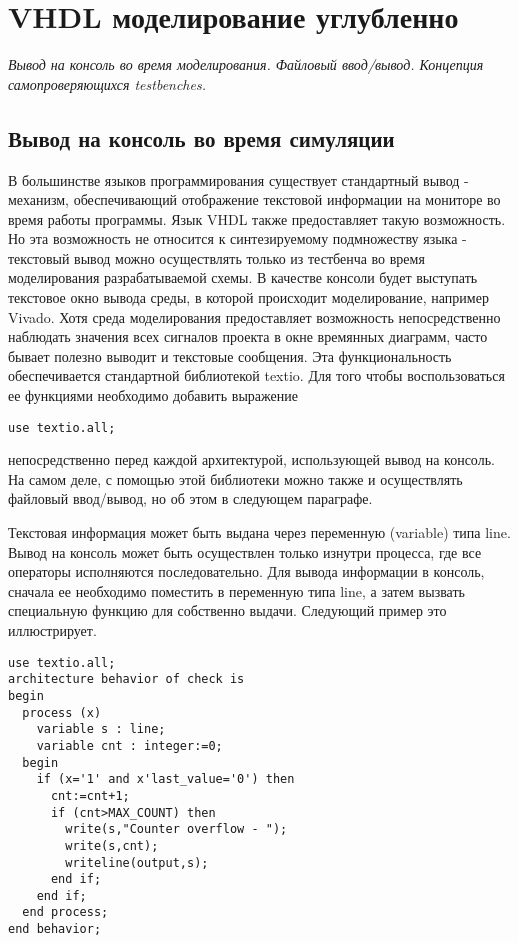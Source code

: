 \chapter{VHDL моделирование углубленно}

\emph{Вывод на консоль во время моделирования. Файловый ввод/вывод. Концепция самопроверяющихся testbenches.}

\section{Вывод на консоль во время симуляции}

В большинстве языков программирования существует стандартный вывод - механизм, обеспечивающий отображение текстовой информации на мониторе во время работы программы. Язык VHDL также предоставляет такую возможность. Но эта возможность не относится к синтезируемому подмножеству языка - текстовый вывод можно осуществлять только из тестбенча во время моделирования разрабатываемой схемы. В качестве консоли будет выступать текстовое окно вывода среды, в которой происходит моделирование, например Vivado. Хотя среда моделирования предоставляет возможность непосредственно наблюдать значения всех сигналов проекта в окне времянных диаграмм, часто бывает полезно выводит и текстовые сообщения. Эта функциональность обеспечивается стандартной библиотекой textio. Для того чтобы воспользоваться ее функциями необходимо добавить выражение

\begin{lstlisting}
use textio.all;
\end{lstlisting}
непосредственно перед каждой архитектурой, использующей вывод на консоль. На самом деле, с помощью этой библиотеки можно также и осуществлять файловый ввод/вывод, но об этом в следующем параграфе. 

Текстовая информация может быть выдана через переменную (variable) типа line. Вывод на консоль может быть осуществлен только изнутри процесса, где все операторы исполняются последовательно. Для вывода информации в консоль, сначала ее необходимо поместить в переменную типа line, а затем вызвать специальную функцию для собственно выдачи. Следующий пример это иллюстрирует.

\begin{lstlisting}[caption=Вывод в консоль, float]
use textio.all;
architecture behavior of check is
begin
  process (x)
    variable s : line;
    variable cnt : integer:=0;
  begin
    if (x='1' and x'last_value='0') then
      cnt:=cnt+1;
      if (cnt>MAX_COUNT) then
        write(s,"Counter overflow - ");
        write(s,cnt);
        writeline(output,s);
      end if;
    end if;
  end process;
end behavior;
\end{lstlisting}


